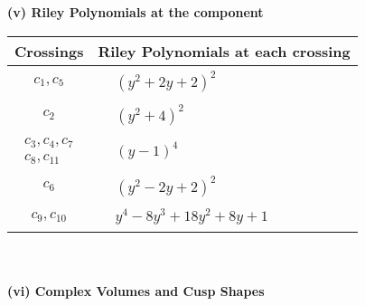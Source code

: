 \documentclass[1p]{elsarticle_modified}
\theoremstyle{definition}
\begin{document}
\newpage\renewcommand{\arraystretch}{1}
\flushleft \textbf{(v) Riley Polynomials at the component}\newline \\
\begin{tabular}{m{50pt}|m{274pt}}
Crossings & \hspace{64pt}Riley Polynomials at each crossing \\
\hline $$\begin{aligned}c_{1},c_{5}\end{aligned}$$&$\begin{aligned}
&(y^2+2 y+2)^2
\end{aligned}$\\
\hline $$\begin{aligned}c_{2}\end{aligned}$$&$\begin{aligned}
&(y^2+4)^2
\end{aligned}$\\
\hline $$\begin{aligned}c_{3},c_{4},c_{7}\\c_{8},c_{11}\end{aligned}$$&$\begin{aligned}
&(y-1)^4
\end{aligned}$\\
\hline $$\begin{aligned}c_{6}\end{aligned}$$&$\begin{aligned}
&(y^2-2 y+2)^2
\end{aligned}$\\
\hline $$\begin{aligned}c_{9},c_{10}\end{aligned}$$&$\begin{aligned}
&y^4-8 y^3+18 y^2+8 y+1
\end{aligned}$\\
\hline
\end{tabular}\\~\\
\newpage\flushleft \textbf{(vi) Complex Volumes and Cusp Shapes}
\end{document}
